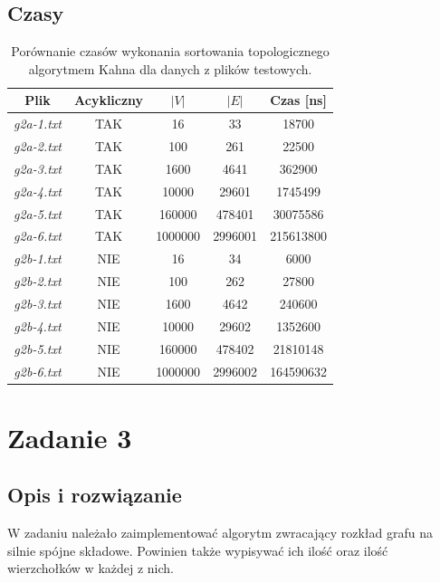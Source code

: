 \documentclass{article}
\begin{document}
\subsection{Czasy}
\begin{table}[H]
\begin{adjustbox}{center}
\begin{tabular}{|c|c|c|c|c|}
    \hline
    Plik & Acykliczny & $|V|$ & $|E|$ & Czas [ns]\\
    \hline
    \textit{g2a-1.txt} & TAK & 16 & 33 & 18700\\
    \hline
    \textit{g2a-2.txt} & TAK & 100 & 261 & 22500\\
    \hline
    \textit{g2a-3.txt} & TAK & 1600 & 4641 & 362900\\
    \hline
    \textit{g2a-4.txt} & TAK & 10000 & 29601 & 1745499\\
    \hline
    \textit{g2a-5.txt} & TAK & 160000 & 478401 & 30075586\\
    \hline
    \textit{g2a-6.txt} & TAK & 1000000 & 2996001 & 215613800\\
    \hline
    \textit{g2b-1.txt} & NIE & 16 & 34 & 6000\\
    \hline
    \textit{g2b-2.txt} & NIE & 100 & 262 & 27800\\
    \hline
    \textit{g2b-3.txt} & NIE & 1600 & 4642 & 240600\\
    \hline
    \textit{g2b-4.txt} & NIE & 10000 & 29602 & 1352600\\
    \hline
    \textit{g2b-5.txt} & NIE & 160000 & 478402 & 21810148\\
    \hline
    \textit{g2b-6.txt} & NIE & 1000000 & 2996002 & 164590632\\
    \hline
\end{tabular}
\end{adjustbox}
\caption{Porównanie czasów wykonania sortowania topologicznego algorytmem Kahna dla danych z plików testowych.}
\end{table}

\section{Zadanie 3}
\subsection{Opis i rozwiązanie}
W zadaniu należało zaimplementować algorytm zwracający rozkład grafu na silnie spójne składowe. Powinien także
wypisywać ich ilość oraz ilość wierzchołków w każdej z nich.
\end{document}
